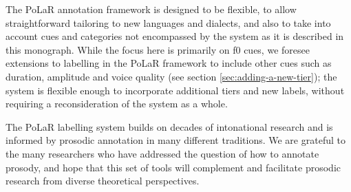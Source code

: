 The PoLaR annotation framework is designed to be flexible, to allow straightforward tailoring to new languages and dialects, and also to take into account cues and categories not encompassed by the system as it is described in this monograph. While the focus here is primarily on f0 cues, we foresee extensions to labelling in the PoLaR framework to include other cues such as duration, amplitude and voice quality (see section \ref{sec:adding-a-new-tier}); the system is flexible enough to incorporate additional tiers and new labels, without requiring a reconsideration of the system as a whole.

The PoLaR labelling system builds on decades of intonational research and is informed by prosodic annotation in many different traditions. We are grateful to the many researchers who have addressed the question of how to annotate prosody, and hope that this set of tools will complement and facilitate prosodic research from diverse theoretical perspectives.